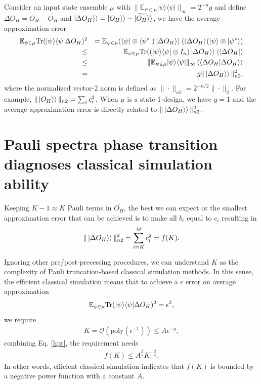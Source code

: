 \documentclass[showpacs,amsmath,amssymb,twocolumn,superscriptaddress,notitlepage,preprintnumbers,aps,pra,10pt,floatfix]{revtex4-2}
\begin{document}
\begin{appendix}
Consider an input state ensemble $\mu$ with $\|\mathbb{E}_{\psi\in\mu}|\psi\rangle\langle \psi|\|_{\infty}=2^{-n}g$ and define $\Delta O_{H}=O_H-\widetilde{O_H}$ and $\ket{\Delta O_{H}\rangle}=\ket{O_H\rangle}-\ket{\widetilde{O_H}\rangle}$, we have the average approximation error
\begin{eqnarray}\label{hpt}
\mathbb{E}_{\psi\in\mu}\mathrm{Tr}(|\psi\rangle\langle\psi| \Delta O_H)^2&&=\mathbb{E}_{\psi\in\mu}(\langle\psi|\otimes \langle\psi^*| )\ket{\Delta O_{H}\rangle}\bra{\langle\Delta O_{H}}(|\psi\rangle\otimes |\psi^*\rangle)\nonumber\\\leq && \mathbb{E}_{\psi\in\mu}\mathrm{Tr}((|\psi\rangle\langle \psi| \otimes I_n)\ket{\Delta O_{H}\rangle}\bra{\langle\Delta O_{H}})\nonumber\\\leq && \|\mathbb{E}_{\psi\in\mu}|\psi\rangle\langle \psi|\|_{\infty}\braket{\langle\Delta O_{H}|\Delta O_{H}\rangle}\nonumber\\=&&g \|\ket{\Delta O_{H}\rangle}\|_{n2}^2,
\end{eqnarray}
where the normalized vector-2 norm is defined as $\|\cdot\|_{n2}=2^{-n/2}\|\cdot\|_{2}$. For example, $\|\ket{O_H\rangle}\|_{n2}=\sum_i c_i^2$. When $\mu$ is a state 1-design, we have $g=1$ and the average approximation error is directly related to $\|\ket{\Delta O_{H}\rangle}\|_{n2}^2$.

\section{Pauli spectra phase transition diagnoses classical simulation ability}
Keeping $K-1\approx K$ Pauli terms in $\overline{O_H}$, the best we can expect or the smallest approximation error that can be achieved is to make all $b_i$ equal to $c_i$ resulting in
\begin{eqnarray}
\|\ket{\Delta O_{H}\rangle}\|_{n2}^2=\sum_{i=K}^M c_i^2=f(K).
\end{eqnarray}

Ignoring other pre/post-precessing procedures, we can understand $K$ as the complexity of Pauli truncation-based classical simulation methods. In this sense, the efficient classical simulation means that to achieve a $\epsilon$ error on average approximation \begin{eqnarray}
\mathbb{E}_{\psi\in\mu}\mathrm{Tr}(|\psi\rangle\langle\psi| \Delta O_H)^2=\epsilon^2,
\end{eqnarray}
we require 
\begin{eqnarray}
K=\mathcal{O}(\text{poly}(\epsilon^{-1}))\leq A \epsilon^{-\eta},
\end{eqnarray}
combining Eq. \ref{hpt}, the requirement needs
\begin{eqnarray}
f(K)\leq A^{\frac{2}{\eta}}K^{-\frac{2}{\eta}}.
\end{eqnarray}
In other words, efficient classical simulation indicates that $f(K)$ is bounded by a negative power function with a constant $A$.


\end{appendix}
\end{document}
